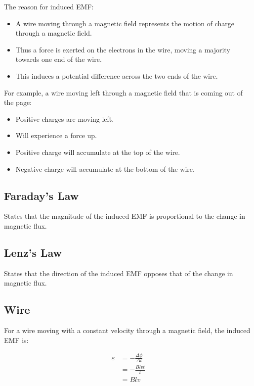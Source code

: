 \documentclass[a4paper,11pt]{article}
\begin{document}
The reason for induced EMF:

\begin{itemize}
\item A wire moving through a magnetic field represents the motion of charge
	through a magnetic field.
\item Thus a force is exerted on the electrons in the wire, moving a majority
	towards one end of the wire.
\item This induces a potential difference across the two ends of the wire.
\end{itemize}

For example, a wire moving left through a magnetic field that is coming out of
the page:

\begin{itemize}
\item Positive charges are moving left.
\item Will experience a force up.
\item Positive charge will accumulate at the top of the wire.
\item Negative charge will accumulate at the bottom of the wire.
\end{itemize}


\subsection{Faraday's Law}

States that the magnitude of the induced EMF is proportional to the change in
magnetic flux.


\subsection{Lenz's Law}

States that the direction of the induced EMF opposes that of the change in
magnetic flux.


\subsection{Wire}

For a wire moving with a constant velocity through a magnetic field, the induced
EMF is:

$$
\begin{aligned}
\varepsilon & = -\frac{\Delta \phi}{\Delta t} \\
& = -\frac{Blvt}{t} \\
& = Blv \\
\end{aligned}
$$
\end{document}
